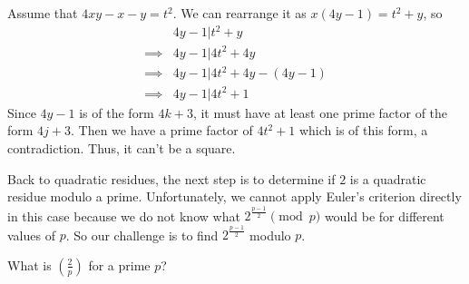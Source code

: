 \documentclass[12pt]{subfile}
\begin{document}
	\begin{solution}
		Assume that $4xy-x-y=t^2$. We can rearrange it as $x(4y-1)  = t^2+y$, so
			\begin{align*}
				&4y-1  | t^2+y\\
				\implies &4y-1  | 4t^2+4y\\
				\implies &4y-1  |4t^2+4y-(4y-1)\\
				\implies &4y-1  | 4t^2+1
			\end{align*}
		Since $4y-1$ is of the form $4k+3$, it must have at least one prime factor of the form $4j+3$. Then we have a prime factor of $4t^2+1$ which is of this form, a contradiction. Thus, it can't be a square.
	\end{solution}
Back to quadratic residues, the next step is to determine if $2$ is a quadratic residue modulo a prime. Unfortunately, we cannot apply Euler's criterion directly in this case because we do not know what $2^\frac{p-1}{2} \pmod p$ would be for different values of $p$. So our challenge is to find $2^\frac{p-1}{2}$ modulo $p$.
	
	\begin{problem}\label{pr:qr2p}
		What is $ \left(\frac{2}{p}\right)$ for a prime $p$?
	\end{problem}
	
\end{document}
